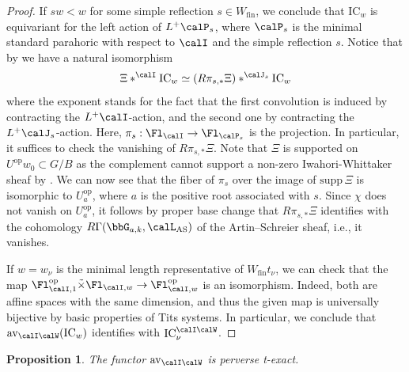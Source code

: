 \documentclass[10pt, reqno]{amsart}
\theoremstyle{plain}
\newtheorem{proposition}[theorem]{Proposition}
\theoremstyle{definition}
\numberwithin{equation}{section}
\begin{document}
\begin{proof}
	If $sw<w$ for some simple reflection $s\in W_{\mathrm{fin}}$, we conclude that $\mathrm{IC}_w$ is equivariant for the left action of $L^+\calP_s$, where $\calP_s$ is the minimal standard parahoric with respect to $\calI$ and the simple reflection $s$. Notice that by \cite[Lemma 2.5]{BGMRR19} we have a natural isomorphism
	\begin{equation}\Xi \ast^{\calI} \mathrm{IC}_w \simeq (R\pi_{s,*}\Xi)\ast^{\calJ_s} \mathrm{IC}_w
	\end{equation} where the exponent stands for the fact that the first convolution is induced by contracting the $L^+\calI$-action, and the second one by contracting the $L^+\calJ_s$-action. Here, $\pi_s:\Fl_\calI\to \Fl_{\calP_s}$ is the projection. In particular, it suffices to check the vanishing of $R\pi_{s,*}\Xi$. Note that $\Xi$ is supported on $U^{\mathrm{op}}w_0 \subset G/B$ as the complement cannot support a non-zero Iwahori-Whittaker sheaf by . We can now see that the fiber of $\pi_s$ over the image of $\mathrm{supp}\,\Xi$ is isomorphic to $U_{a}^{\mathrm{op}}$, where $a$ is the positive root associated with $s$. Since $\chi$ does not vanish on $U_a^{\mathrm{op}}$, it follows by proper base change that $R\pi_{s,*}\Xi$ identifies with the cohomology $R\Gamma(\bbG_{a,k},\calL_{\mathrm{AS}})$ of the Artin--Schreier sheaf, i.e., it vanishes. 
	
	If $w=w_\nu$ is the minimal length representative of $W_{\mathrm{fin}}t_\nu$, we can check that the map $\Fl_{ \calI,1}^{\mathrm{op}}\tilde{\times}\Fl_{\calI,w} \to \Fl_{\calI,w}^{\mathrm{op}}$ is an isomorphism. Indeed, both are affine spaces with the same dimension, and thus the given map is universally bijective by basic properties of Tits systems. In particular, we conclude that $\mathrm{av}_{\calI\calW}(\mathrm{IC}_{w})$ identifies with $\mathrm{IC}_{\nu}^{\calI\calW}$.
\end{proof}

\begin{proposition}\label{aviw_is_t_exact}
	The functor $\mathrm{av}_{\calI\calW}$ is perverse t-exact.
\end{proposition}
\end{document}
